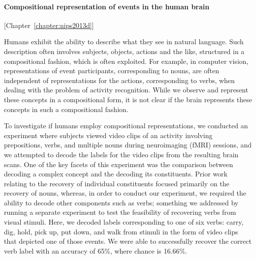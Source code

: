\paragraph{Compositional representation of events in the human brain} [Chapter~\ref{chapter:nips2013d}]

Humans exhibit the ability to describe what they see in natural language.
%
Such description often involves subjects, objects, actions and the like,
structured in a compositional fashion, which is often exploited.
%
For example, in computer vision, representations of event participants,
corresponding to nouns, are often independent of representations for the
actions, corresponding to verbs, when dealing with the problem of activity
recognition.
%
While we observe and represent these concepts in a compositional form, it is
not clear if the brain represents these concepts in such a compositional
fashion.

To investigate if humans employ compositional representations, we conducted
an experiment where subjects viewed video clips of an activity involving
prepositions, verbs, and multiple nouns during neuroimaging (fMRI) sessions,
and we attempted to decode the labels for the video clips from the resulting
brain scans.
%
One of the key facets of this experiment was the comparison between decoding
a complex concept and the decoding its constituents.
%
Prior work relating to the recovery of individual constituents focused
primarily on the recovery of nouns, whereas, in order to conduct our
experiment, we required the ability to decode other components such as verbs;
something we addressed by running a separate experiment to test the
feasibility of recovering verbs from visual stimuli.
%
Here, we decoded labels corresponding to one of six verbs: carry, dig, hold,
pick up, put down, and walk from stimuli in the form of video clips that
depicted one of those events.
%
We were able to successfully recover the correct verb label with an accuracy
of 65\%, where chance is 16.66\%.

